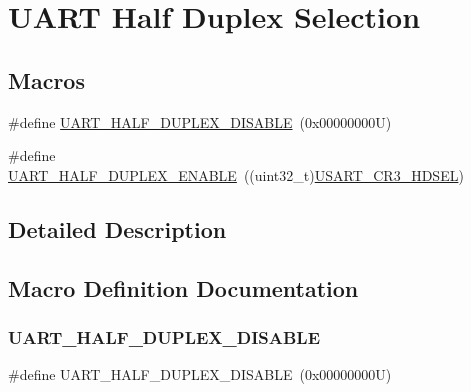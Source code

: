 \hypertarget{group___u_a_r_t___half___duplex___selection}{}\section{U\+A\+RT Half Duplex Selection}
\label{group___u_a_r_t___half___duplex___selection}
\subsection*{Macros}
\begin{DoxyCompactItemize}
\item 
\#define \hyperlink{group___u_a_r_t___half___duplex___selection_ga282d253c045fd9a3785c6c3e3293346c}{U\+A\+R\+T\+\_\+\+H\+A\+L\+F\+\_\+\+D\+U\+P\+L\+E\+X\+\_\+\+D\+I\+S\+A\+B\+LE}~(0x00000000\+U)
\item 
\#define \hyperlink{group___u_a_r_t___half___duplex___selection_ga61e92cc4435c05d850f9fd5456f391e6}{U\+A\+R\+T\+\_\+\+H\+A\+L\+F\+\_\+\+D\+U\+P\+L\+E\+X\+\_\+\+E\+N\+A\+B\+LE}~((uint32\+\_\+t)\hyperlink{group___peripheral___registers___bits___definition_gac71129810fab0b46d91161a39e3f8d01}{U\+S\+A\+R\+T\+\_\+\+C\+R3\+\_\+\+H\+D\+S\+EL})
\end{DoxyCompactItemize}


\subsection{Detailed Description}


\subsection{Macro Definition Documentation}
\mbox{\label{group___u_a_r_t___half___duplex___selection_ga282d253c045fd9a3785c6c3e3293346c}} 
\subsubsection{\texorpdfstring{U\+A\+R\+T\+\_\+\+H\+A\+L\+F\+\_\+\+D\+U\+P\+L\+E\+X\+\_\+\+D\+I\+S\+A\+B\+LE}{UART\_HALF\_DUPLEX\_DISABLE}}
{\footnotesize\ttfamily \#define U\+A\+R\+T\+\_\+\+H\+A\+L\+F\+\_\+\+D\+U\+P\+L\+E\+X\+\_\+\+D\+I\+S\+A\+B\+LE~(0x00000000\+U)}

